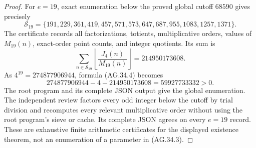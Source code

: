 \begin{proof}
For $e=19$, exact enumeration below the proved global
cutoff $68590$ gives precisely
\[
 \mathcal S_{19}=\{191,229,361,419,457,571,573,647,687,
                         955,1083,1257,1371\}.
\]
The certificate records all factorizations, totients,
multiplicative orders, values of $M_{19}(n)$, exact-order
point counts, and integer quotients. Its sum is
\[
 \sum_{n\in\mathcal S_{19}}
      \left\lfloor\frac{J_4(n)}{M_{19}(n)}\right\rfloor
       =214950173608.
\]
As $4^{19}=274877906944$, formula (AG.34.4) becomes
\[
             274877906944-4-214950173608
                     =59927733332>0.
\]
The root program 
and its complete JSON output give the global enumeration.
The independent review
factors every odd integer below the cutoff by trial division
and recomputes every relevant multiplicative order without
using the root program's sieve or cache. Its complete JSON
agrees on every $e=19$ record. These are exhaustive finite
arithmetic certificates for the displayed existence theorem,
not an enumeration of a parameter in (AG.34.3).
\end{proof}

